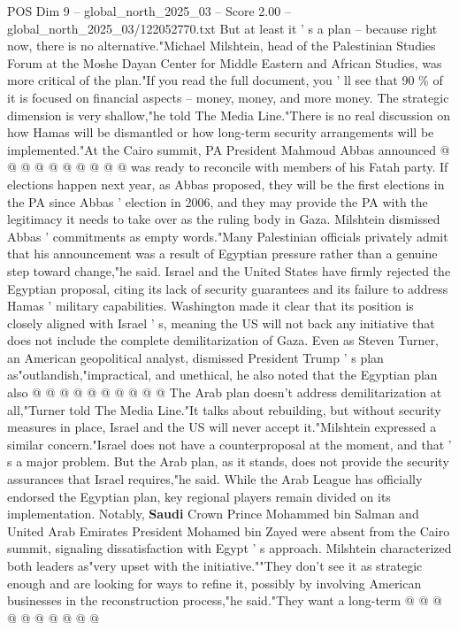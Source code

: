 \begin{textsample}{POS Dim 9 – global\_north\_2025\_03 – Score 2.00 – global\_north\_2025\_03/122052770.txt}
But at least it ' s a plan -- because right now, there is no alternative."Michael Milshtein, head of the Palestinian Studies Forum at the Moshe Dayan Center for Middle Eastern and African Studies, was more critical of the plan."If you read the full document, you ' ll see that 90 \% of it is focused on financial aspects -- money, money, and more money.
The strategic dimension is very shallow,"he told The Media Line."There is no real discussion on how Hamas will be dismantled or how long-term security arrangements will be implemented."At the Cairo summit, PA President Mahmoud Abbas announced @ @ @ @ @ @ @ @ @ @ was ready to reconcile with members of his Fatah party.
If elections happen next year, as Abbas proposed, they will be the first elections in the PA since Abbas ' election in 2006, and they may provide the PA with the legitimacy it needs to take over as the ruling body in Gaza.
Milshtein dismissed Abbas ' commitments as empty words."Many Palestinian officials privately admit that his announcement was a result of Egyptian pressure rather than a genuine step toward change,"he said.
Israel and the United States have firmly rejected the Egyptian proposal, citing its lack of security guarantees and its failure to address Hamas ' military capabilities.
Washington made it clear that its position is closely aligned with Israel ' s, meaning the US will not back any initiative that does not include the complete demilitarization of Gaza.
Even as Steven Turner, an American geopolitical analyst, dismissed President Trump ' s plan as"outlandish,"impractical, and unethical, he also noted that the Egyptian plan also @ @ @ @ @ @ @ @ @ @ The Arab plan doesn't address demilitarization at all,"Turner told The Media Line."It talks about rebuilding, but without security measures in place, Israel and the US will never accept it."Milshtein expressed a similar concern."Israel does not have a counterproposal at the moment, and that ' s a major problem.
But the Arab plan, as it stands, does not provide the security assurances that Israel requires,"he said.
While the Arab League has officially endorsed the Egyptian plan, key regional players remain divided on its implementation.
Notably, \textbf{Saudi} Crown Prince Mohammed bin Salman and United Arab Emirates President Mohamed bin Zayed were absent from the Cairo summit, signaling dissatisfaction with Egypt ' s approach.
Milshtein characterized both leaders as"very upset with the initiative.""They don't see it as strategic enough and are looking for ways to refine it, possibly by involving American businesses in the reconstruction process,"he said."They want a long-term @ @ @ @ @ @ @ @ @ @

\end{textsample}
